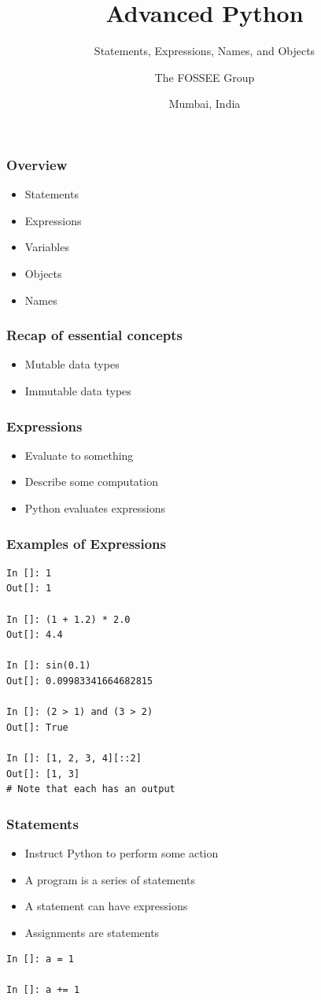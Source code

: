 \documentclass[14pt,compress,aspectratio=169]{beamer}
\title[Names and Objects]{Advanced Python}
\subtitle{Statements, Expressions, Names, and Objects}
\author[FOSSEE] {The FOSSEE Group}
\institute[IIT Bombay] {Department of Aerospace Engineering\\IIT Bombay}
\date[] {Mumbai, India}
\begin{document}
\begin{frame}
  \titlepage
\end{frame}

\begin{frame}
  \frametitle{Overview}
  \begin{itemize}
  \item Statements
  \item Expressions
  \item Variables
  \item Objects
  \item Names
  \end{itemize}
\end{frame}

\begin{frame}
  \frametitle{Recap of essential concepts}
  \begin{itemize}
  \item Mutable data types
  \item Immutable data types
  \end{itemize}
\end{frame}

\begin{frame}
  \frametitle{Expressions}
  \begin{itemize}
  \item Evaluate to something
  \item Describe some computation
  \item Python evaluates expressions
  \end{itemize}
\end{frame}

\begin{frame}[fragile]
  \frametitle{Examples of Expressions}
  \small
  \begin{lstlisting}
In []: 1
Out[]: 1

In []: (1 + 1.2) * 2.0
Out[]: 4.4

In []: sin(0.1)
Out[]: 0.09983341664682815

In []: (2 > 1) and (3 > 2)
Out[]: True

In []: [1, 2, 3, 4][::2]
Out[]: [1, 3]
# Note that each has an output
  \end{lstlisting}
\end{frame}

\begin{frame}[fragile]
  \frametitle{Statements}
  \begin{itemize}
  \item Instruct Python to perform some action
  \item A program is a series of statements
  \item A statement can have expressions
  \item Assignments are statements
  \end{itemize}
\begin{lstlisting}
In []: a = 1

In []: a += 1
\end{lstlisting}
\end{frame}
\end{document}
